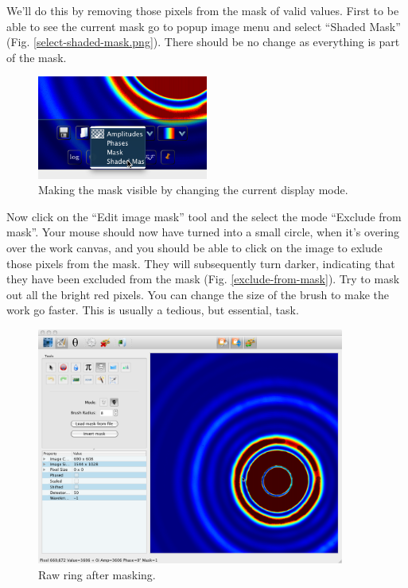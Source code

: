 \documentclass[a4paper]{article}
\begin{document}
We'll do this by removing those pixels from the mask of valid values.
First to be able to see the current mask go to popup image menu and
select ``Shaded Mask'' (Fig. \ref{select-shaded-mask.png}).
There should be no change as everything is part of the mask.

\begin{figure}[h!]
\centering
\includegraphics[width=0.5\textwidth]{./select-shaded-mask.png}
\caption{Making the mask visible by changing the current display mode.}
\label{select-shaded-mask}   
\end{figure}

Now click on the ``Edit image mask'' tool and the select the mode
``Exclude from mask''. Your mouse should now have turned into a small
circle, when it's overing over the work canvas, and you should be able
to click on the image to exlude those pixels from the mask. They will
subsequently turn darker, indicating that they have been excluded from
the mask (Fig. \ref{exclude-from-mask}). Try to mask out all the
bright red pixels. You can change the size of the brush to make the
work go faster. This is usually a tedious, but essential, task.

\begin{figure}[h!]
\centering
\includegraphics[width=0.9\textwidth]{./after-masking.png}
\caption{Raw ring after masking.}
\label{select-shaded-mask}   
\end{figure}
\end{document}
